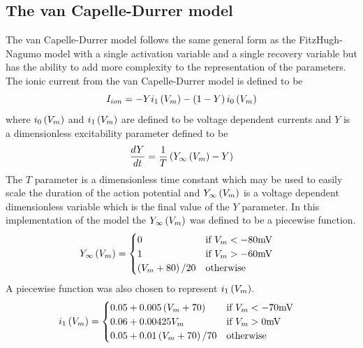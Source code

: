 \subsection{The van Capelle-Durrer model}
\label{The_van_Capelle-Durrer_Model}
The van Capelle-Durrer model \cite{vancapelle:1980} follows the same general form as the
FitzHugh-Nagumo model with a single activation variable and a single recovery
variable but has the ability to add more complexity to the representation of
the parameters. The ionic current from the van Capelle-Durrer model is defined
to be
\begin{equation}
  I_{ion}=-Y  i_1\left( V_m \right)  - \left( 1-Y \right) i_0\left( V_m \right) 
\end{equation}
where $ i_0\left( V_m \right) $ and $ i_1\left( V_m \right) $ are defined to be voltage
dependent currents and $Y$ is 
a dimensionless excitability parameter defined to be 
\begin{equation}
   \dfrac{ d Y}{d t} =\dfrac{1}{T}\left(  Y_{\infty}\left( V_m \right) -Y \right)
\end{equation}
The $T$ parameter is a dimensionless time constant which may be used to easily scale the
duration of the action potential and $ Y_{\infty}\left( V_m \right) $ is a voltage dependent
dimensionless variable which is the final value of the $Y$ parameter. In this
implementation of the model the $ Y_{\infty}\left( V_m \right) $ was defined to be a piecewise
function. 
\begin{gather}
  \label{eqn:three_cases_of_Y_VCD}
  \begin{aligned}
   Y_{\infty}\left( V_m \right)  &=
  \begin{cases}
    0 & \text{if $V_m < -80\mathrm{mV}$} \\
    1 & \text{if $V_m > -60\mathrm{mV}$} \\
    \left( V_m+80 \right)/20 & \text{otherwise}
  \end{cases}
  \end{aligned}
\end{gather}
A piecewise function was also chosen to represent $ i_1\left( V_m \right) $.
\begin{gather}
  \label{eqn:three_cases_of_i1_VCD}
  \begin{aligned}
   i_1\left( V_m \right)  &=
  \begin{cases}
    0.05+0.005\left( V_m+70 \right) 
      & \text{if $V_m < -70\mathrm{mV}$} \\
    0.06+0.00425V_m 
      & \text{if $V_m > 0\mathrm{mV}$} \\
    0.05+0.01\left( V_m+70 \right)/70 
      & \text{otherwise}
  \end{cases}
  \end{aligned}
\end{gather}
